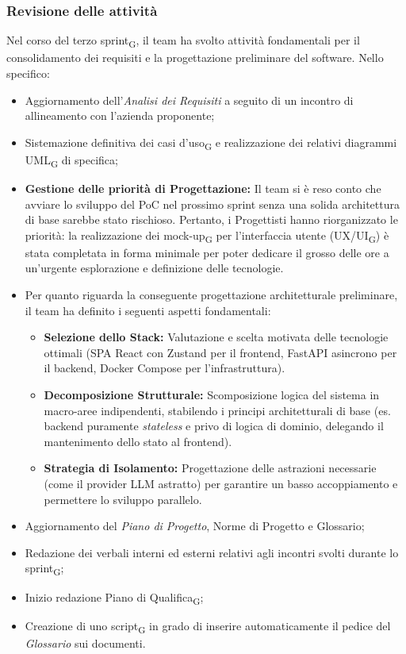 ﻿\documentclass[a4paper, 10pt, colorlinks=true, linkcolor=black, urlcolor=blue, citecolor=blue, hidelinks]{article}
\begin{document}
\subsubsection{Revisione delle attività}
Nel corso del terzo sprint\textsubscript{G}, il team ha svolto attività fondamentali per il consolidamento dei requisiti e la progettazione preliminare del software. Nello specifico:
\begin{itemize}
    \item Aggiornamento dell'\textit{Analisi dei Requisiti} a seguito di un incontro di allineamento con l'azienda proponente;
    \item Sistemazione definitiva dei casi d'uso\textsubscript{G} e realizzazione dei relativi diagrammi UML\textsubscript{G} di specifica;
    \item \textbf{Gestione delle priorità di Progettazione:} Il team si è reso conto che avviare lo sviluppo del PoC nel prossimo sprint senza una solida architettura di base sarebbe stato rischioso. Pertanto, i Progettisti hanno riorganizzato le priorità: la realizzazione dei mock-up\textsubscript{G} per l'interfaccia utente (UX/UI\textsubscript{G}) è stata completata in forma minimale per poter dedicare il grosso delle ore a un'urgente esplorazione e definizione delle tecnologie.
    \item Per quanto riguarda la conseguente progettazione architetturale preliminare, il team ha definito i seguenti aspetti fondamentali:
    \begin{itemize}
        \item \textbf{Selezione dello Stack:} Valutazione e scelta motivata delle tecnologie ottimali (SPA React con Zustand per il frontend, FastAPI asincrono per il backend, Docker Compose per l'infrastruttura).
        \item \textbf{Decomposizione Strutturale:} Scomposizione logica del sistema in macro-aree indipendenti, stabilendo i principi architetturali di base (es. backend puramente \textit{stateless} e privo di logica di dominio, delegando il mantenimento dello stato al frontend).
        \item \textbf{Strategia di Isolamento:} Progettazione delle astrazioni necessarie (come il provider LLM astratto) per garantire un basso accoppiamento e permettere lo sviluppo parallelo.
    \end{itemize}
    \item Aggiornamento del \textit{Piano di Progetto}, Norme di Progetto e Glossario;
    \item Redazione dei verbali interni ed esterni relativi agli incontri svolti durante lo sprint\textsubscript{G};
    \item Inizio redazione Piano di Qualifica\textsubscript{G};
    \item Creazione di uno script\textsubscript{G} in grado di inserire automaticamente il pedice del \textit{Glossario} sui documenti.
\end{itemize}
\end{document}
